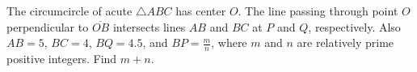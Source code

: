 The circumcircle of acute $\triangle ABC$ has center $O$. The line passing through point $O$ perpendicular to $\overline{OB}$ intersects lines $AB$ and $BC$ at $P$ and $Q$,  respectively. Also $AB=5$,  $BC=4$,  $BQ=4.5$,  and $BP=\frac{m}{n}$,  where $m$ and $n$ are relatively prime positive integers. Find $m+n$.